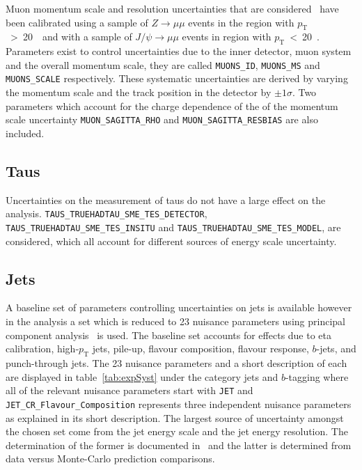 Muon momentum scale and resolution uncertainties that are
considered~\cite{muonTWiki} have been calibrated using a sample of  $Z\to\mu\mu$
events in the region with $p_{\mathrm{T}}$~>~20~\GeV\ and with a sample of
$J/\psi\rightarrow \mu\mu$ events in region with $p_{\mathrm{T}}$~<~20~\GeV.
Parameters exist to control uncertainties due to the inner detector, muon system
and the overall momentum scale, they are called \texttt{MUONS\_ID},
\texttt{MUONS\_MS} and \texttt{MUONS\_SCALE} respectively. These systematic
uncertainties are derived by varying the momentum scale and the track position
in the detector by $\pm 1\sigma$. Two parameters which account for the charge
dependence of the of the momentum scale uncertainty \texttt{MUON\_SAGITTA\_RHO}
and \texttt{MUON\_SAGITTA\_RESBIAS} are also included.

\subsection{Taus}

Uncertainties on the measurement of taus do not have a large effect
on the analysis. \texttt{TAUS\_TRUEHADTAU\_SME\_TES\_DETECTOR},
\texttt{TAUS\_TRUEHADTAU\_SME\_TES\_INSITU} and
\texttt{TAUS\_TRUEHADTAU\_SME\_TES\_MODEL}, are considered, which all account
for different sources of energy scale uncertainty.

\subsection{Jets}

A baseline set of parameters controlling uncertainties on jets is available
however in the analysis a set which is reduced to 23 nuisance parameters using
principal component analysis~\cite{PCA} is used. The baseline set accounts for
effects due to eta calibration, high-$p_{\mathrm{T}}$ jets, pile-up, flavour
composition, flavour response, $b$-jets, and punch-through jets. The 23 nuisance
parameters and a short description of each are displayed in
table~\ref{tab:expSyst} under the category jets and $b$-tagging where all of the
relevant nuisance parameters start with \texttt{JET} and
\texttt{JET\_CR\_Flavour\_Composition} represents three independent nuisance
parameters as explained in its short description. The largest source of
uncertainty amongst the chosen set come from the jet energy scale and the jet
energy resolution. The determination of the former is documented
in~\cite{JetCalibration2015} and the latter is determined from data versus
Monte-Carlo prediction comparisons.

